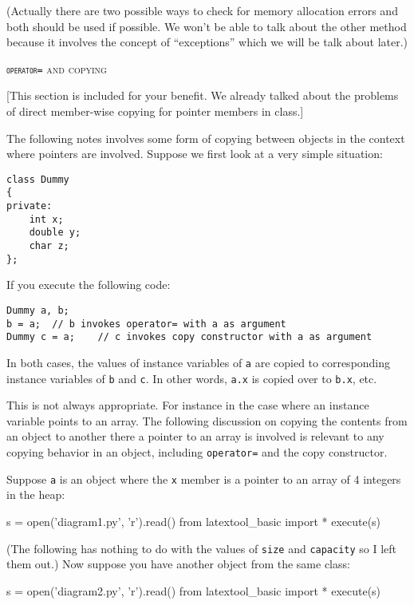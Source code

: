 (Actually there are two possible ways to check for memory allocation errors 
and both should be used if possible. We won't be able to talk about the other 
method because it involves the concept of “exceptions” which we will be talk 
about later.)


\newpage 
\textsc{\textnormal{\texttt{operator=}} and copying}

[This section is included for your benefit. We already talked about the 
problems of direct member-wise copying for pointer members in class.]

The following notes involves some form of copying between objects in the 
context where pointers are involved. Suppose we first look at a very simple 
situation:

\begin{Verbatim}[frame=single]
class Dummy
{
private:
    int x;
    double y;
    char z;
};
\end{Verbatim}

If you execute the following code:

\begin{Verbatim}[frame=single]
Dummy a, b;
b = a;  // b invokes operator= with a as argument
Dummy c = a;    // c invokes copy constructor with a as argument
\end{Verbatim}

In both cases, the values of instance variables of \verb!a! are copied to 
corresponding instance variables of \verb!b! and \verb!c!. In other words, 
\verb!a.x! is copied over to \verb!b.x!, etc.

This is not always appropriate. For instance in the case where an instance 
variable points to an array. The following discussion on copying the contents 
from an object to another there a pointer to an array is involved is relevant 
to any copying behavior in an object, including \verb!operator=! and the copy 
constructor. 

Suppose \verb!a! is an object where the \verb!x! member is a pointer to an 
array of 4 integers in the heap:
\begin{python}
s = open('diagram1.py', 'r').read()
from latextool_basic import *
execute(s)
\end{python}

(The following has nothing to do with the values of \verb!size! and \verb!capacity!
so I left them out.)
Now suppose 
you have another object from the same class:
\begin{python}
s = open('diagram2.py', 'r').read()
from latextool_basic import *
execute(s)
\end{python}


